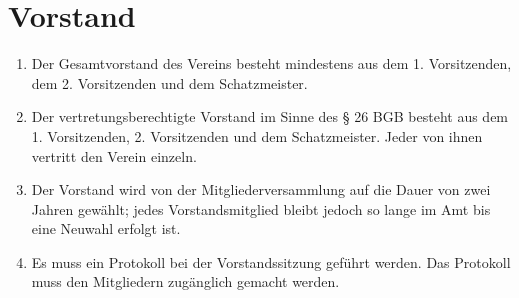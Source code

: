 \documentclass[10pt,conference,a4paper,nofonttune]{IEEEtran}
\begin{document}
\section{Vorstand}
\begin{enumerate}
  \item Der Gesamtvorstand des Vereins besteht mindestens aus dem
    1. Vorsitzenden, dem 2. Vorsitzenden und dem Schatzmeister.

  \item Der vertretungsberechtigte Vorstand im Sinne des § 26 BGB besteht
    aus dem 1.  Vorsitzenden, 2. Vorsitzenden und dem Schatzmeister. Jeder von
    ihnen vertritt den Verein einzeln.

  \item Der Vorstand wird von der Mitgliederversammlung auf die Dauer von zwei
    Jahren gewählt; jedes Vorstandsmitglied bleibt jedoch so lange im Amt bis
    eine Neuwahl erfolgt ist.

  \item Es muss ein Protokoll bei der Vorstandssitzung geführt werden. Das
    Protokoll muss den Mitgliedern zugänglich gemacht werden.
\end{enumerate}
\end{document}

